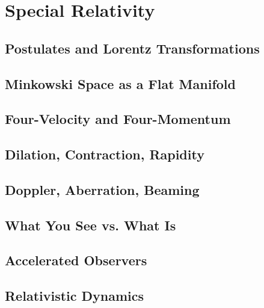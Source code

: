 \chapter{Special Relativity}\label{ch:special-relativity}

\section{Postulates and Lorentz Transformations}\label{sec:postulates-and-lorentz-transformations}

\section{Minkowski Space as a Flat Manifold}\label{sec:minkowski-space-as-a-flat-manifold}

\section{Four-Velocity and Four-Momentum}\label{sec:four-velocity-and-four-momentum}

\section{Dilation, Contraction, Rapidity}\label{sec:dilation-contraction-rapidity}

\section{Doppler, Aberration, Beaming}\label{sec:doppler-aberration-beaming}

\section{What You See vs. What Is}\label{sec:what-you-see-vs-what-is}

\section{Accelerated Observers\optmark}\label{sec:accelerated-observers}

\section{Relativistic Dynamics}\label{sec:relativistic-dynamics}
